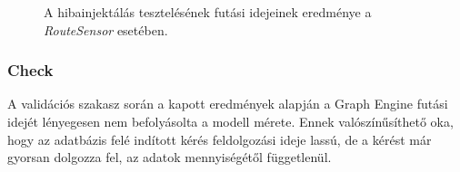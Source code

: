 \pagebreak
\begin{figure}[H]
	\centering
	\vspace*{-2cm}
	\caption{A hibainjektálás tesztelésének futási idejeinek eredménye a \emph{RouteSensor} esetében.}
	\label{fig:RouteSensorInjectResult}
\end{figure}

\subsubsection{Check}

A validációs szakasz során a kapott eredmények alapján a Graph Engine futási idejét lényegesen nem befolyásolta a modell mérete. Ennek valószínűsíthető oka, hogy az adatbázis felé indított kérés feldolgozási ideje lassú, de a kérést már gyorsan dolgozza fel, az adatok mennyiségétől függetlenül.

